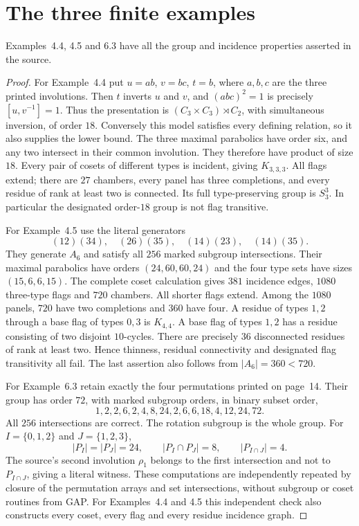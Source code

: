 \documentclass[11pt,a4paper]{article}
\begin{document}
\section{The three finite examples}
\begin{proposition}\label{examples}
Examples~4.4, 4.5 and 6.3 have all the group and incidence properties
asserted in the source.
\end{proposition}
\begin{proof}
For Example~4.4 put $u=ab$, $v=bc$, $t=b$, where $a,b,c$ are the three
printed involutions. Then $t$ inverts $u$ and $v$, and $(abc)^2=1$
is precisely $[u,v^{-1}]=1$. Thus the presentation is
$(C_3\times C_3)\rtimes C_2$, with simultaneous inversion, of order
$18$. Conversely this model satisfies every defining relation, so it
also supplies the lower bound. The three maximal parabolics have order
six, and any two intersect in their common involution. They therefore
have product of size $18$. Every pair of cosets of different types is
incident, giving $K_{3,3,3}$. All flags extend; there are $27$ chambers,
every panel has three completions, and every residue of rank at least
two is connected. Its full type-preserving group is $S_3^3$. In
particular the designated order-$18$ group is not flag transitive.

For Example~4.5 use the literal generators
\[
 (12)(34),\quad(26)(35),\quad(14)(23),\quad(14)(35).
\]
They generate $A_6$ and satisfy all $256$ marked subgroup intersections.
Their maximal parabolics have orders $(24,60,60,24)$ and the four
type sets have sizes $(15,6,6,15)$. The complete coset calculation gives
$381$ incidence edges, $1080$ three-type flags and $720$ chambers.
All shorter flags extend. Among the $1080$ panels, $720$ have two
completions and $360$ have four. A residue of types $1,2$ through a
base flag of types $0,3$ is $K_{4,4}$. A base flag of types $1,2$ has
a residue consisting of two disjoint $10$-cycles. There are precisely
$36$ disconnected residues of rank at least two. Hence thinness,
residual connectivity and designated flag transitivity all fail.
The last assertion also follows from $|A_6|=360<720$.

For Example~6.3 retain exactly the four permutations printed on page~14.
Their group has order $72$, with marked subgroup orders, in binary
subset order,
\[
 1,2,2,6,2,4,8,24,2,6,6,18,4,12,24,72.
\]
All $256$ intersections are correct. The rotation subgroup is the
whole group. For $I=\{0,1,2\}$ and $J=\{1,2,3\}$,
\[
 |P_I|=|P_J|=24,\qquad |P_I\cap P_J|=8,
 \qquad |P_{I\cap J}|=4.
\]
The source's second involution $\rho_1$ belongs to the first
intersection and not to $P_{I\cap J}$, giving a literal witness.
These computations are independently repeated by closure of the
permutation arrays and set intersections, without subgroup or coset
routines from GAP. For Examples~4.4 and 4.5 this independent check also
constructs every coset, every flag and every residue incidence graph.
\end{proof}
\end{document}
